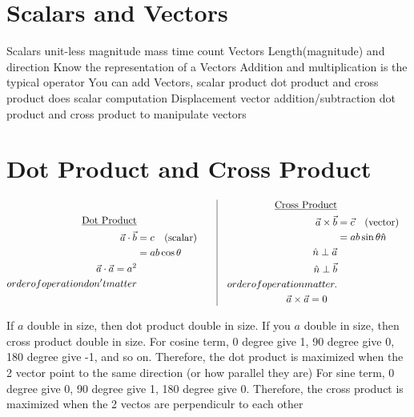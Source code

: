 \documentclass[12pt, letterpaper]{article}
\begin{document}
    \section{Scalars and Vectors}
    \begin{outline}[enumerate]
      \1 Scalars 
        \2 unit-less
        \2 magnitude
        \2 mass
        \2 time
        \2 count
      \1 Vectors
        \2 Length(magnitude) and direction
        \2 Know the representation of a Vectors
        \2 Addition and multiplication is the typical operator
        \2 You can add Vectors, scalar product
          \3 dot product and cross product does scalar computation
        \2 Displacement
      \1 vector addition/subtraction
      \1 dot product and cross product to manipulate vectors
    \end{outline}

    \section{Dot Product and Cross Product}
    \begin{equation}
      \nonumber
      \begin{split}
          \underline{\text{Dot Product}} \\
          \vec{a}\cdot \vec{b} &= c \quad \text{(scalar)} \\
          &= ab \cos{\theta} \quad \\
          \vec{a} \cdot \vec{a} = a^2 \\
          order of operation don't matter
      \end{split}
      \quad \vline \quad
      \begin{split}
          \underline{\text{Cross Product}} \\
          \vec{a} \times \vec{b} &= \vec{c} \quad \text{(vector)} \\
          &= ab \sin{\theta} \hat{n} \\
          \hat{n} \perp \vec{a} \\
          \hat{n} \perp \vec{b} \\
          order of operation matter.\\
          \vec{a} \times \vec{a} = 0
          \quad
      \end{split}
  \end{equation}
  \begin{outline}[enumerate]
  \1 If $a$ double in size, then dot product double in size. 
  \1 If you $a$ double in size, then cross product double in size.
  \1 For cosine term, 0 degree give 1, 90 degree give 0, 180 degree give -1, and so on.
    \2 Therefore, the dot product is maximized when the 2 vector point to the same direction (or how parallel they are)
  \1 For sine term, 0 degree give 0, 90 degree give 1, 180 degree give 0.
    \2 Therefore, the cross product is maximized when the 2 vectos are perpendiculr to each other
  \end{outline}
\end{document}
